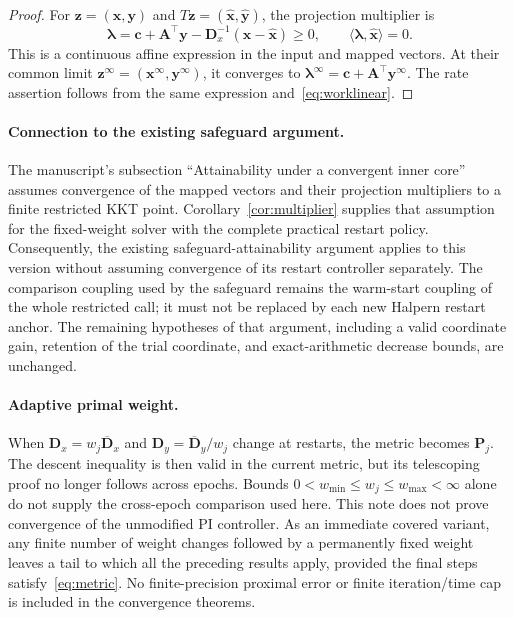 \documentclass[11pt]{article}
\theoremstyle{remark}
\begin{document}
\begin{proof}
For $\mathbf z=(\mathbf x,\mathbf y)$ and $T\mathbf z=(\widehat{\mathbf x},\widehat{\mathbf y})$, the projection multiplier is
\begin{equation}
\boldsymbol\lambda=\mathbf c+\mathbf A^\top\mathbf y-\mathbf D_x^{-1}(\mathbf x-\widehat{\mathbf x})\geq0,\qquad \langle\boldsymbol\lambda,\widehat{\mathbf x}\rangle=0.
\end{equation}
This is a continuous affine expression in the input and mapped vectors.
At their common limit $\mathbf z^\infty=(\mathbf x^\infty,\mathbf y^\infty)$, it converges to $\boldsymbol\lambda^\infty=\mathbf c+\mathbf A^\top\mathbf y^\infty$.
The rate assertion follows from the same expression and~\eqref{eq:worklinear}.
\end{proof}

\paragraph{Connection to the existing safeguard argument.}
The manuscript's subsection ``Attainability under a convergent inner core'' assumes convergence of the mapped vectors and their projection multipliers to a finite restricted KKT point.
Corollary~\ref{cor:multiplier} supplies that assumption for the fixed-weight solver with the complete practical restart policy.
Consequently, the existing safeguard-attainability argument applies to this version without assuming convergence of its restart controller separately.
The comparison coupling used by the safeguard remains the warm-start coupling of the whole restricted call; it must not be replaced by each new Halpern restart anchor.
The remaining hypotheses of that argument, including a valid coordinate gain, retention of the trial coordinate, and exact-arithmetic decrease bounds, are unchanged.

\paragraph{Adaptive primal weight.}
When $\mathbf D_x=w_j\overline{\mathbf D}_x$ and $\mathbf D_y=\overline{\mathbf D}_y/w_j$ change at restarts, the metric becomes $\mathbf P_j$.
The descent inequality is then valid in the current metric, but its telescoping proof no longer follows across epochs.
Bounds $0<w_{\min}\leq w_j\leq w_{\max}<\infty$ alone do not supply the cross-epoch comparison used here.
This note does not prove convergence of the unmodified PI controller.
As an immediate covered variant, any finite number of weight changes followed by a permanently fixed weight leaves a tail to which all the preceding results apply, provided the final steps satisfy~\eqref{eq:metric}.
No finite-precision proximal error or finite iteration/time cap is included in the convergence theorems.
\end{document}
